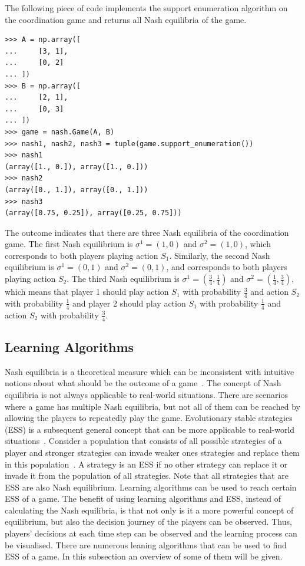 The following piece of code implements the support enumeration algorithm on the
coordination game and returns all Nash equilibria of the game.

\begin{lstlisting}[style=pystyle]
>>> A = np.array([
...     [3, 1],
...     [0, 2]
... ])
>>> B = np.array([
...     [2, 1],
...     [0, 3]
... ])
>>> game = nash.Game(A, B)
>>> nash1, nash2, nash3 = tuple(game.support_enumeration())
>>> nash1
(array([1., 0.]), array([1., 0.]))
>>> nash2
(array([0., 1.]), array([0., 1.]))
>>> nash3
(array([0.75, 0.25]), array([0.25, 0.75]))

\end{lstlisting}

The outcome indicates that there are three Nash equilibria of the coordination
game.
The first Nash equilibrium is \(\sigma^1 = (1, 0)\) and \(\sigma^2 = (1, 0)\),
which corresponds to both players playing action \(S_1\).
Similarly, the second Nash equilibrium is \(\sigma^1 = (0, 1)\) and
\(\sigma^2 = (0, 1)\), and corresponds to both players playing action \(S_2\).
The third Nash equilibrium is \(\sigma^1 = (\frac{3}{4}, \frac{1}{4})\) and
\(\sigma^2 = (\frac{1}{4}, \frac{3}{4})\), which means that player 1 should
play action \(S_1\) with probability \(\frac{3}{4}\) and action \(S_2\) with
probability \(\frac{1}{4}\) and player 2 should play action \(S_1\) with
probability \(\frac{1}{4}\) and action \(S_2\) with probability
\(\frac{3}{4}\).


\subsection{Learning Algorithms}\label{sec:game_intro_learning_algorithms}

Nash equilibria is a theoretical measure which can be inconsistent with
intuitive notions about what should be the outcome of a
game~\cite{myerson1978refinements}.
The concept of Nash equilibria is not always applicable to real-world
situations.
There are scenarios where a game has multiple Nash equilibria, but not all
of them can be reached by allowing the players to repeatedly play the game.
Evolutionary stable strategies (ESS) is a subsequent general concept that can
be more applicable to real-world situations~\cite{nowak1993evolutionary}.
Consider a population that consists of all possible strategies of a player and
stronger strategies can invade weaker ones strategies and replace them in this
population~\cite{smith1972game, smith1973logic}.
A strategy is an ESS if no other strategy can replace it or invade it from the
population of all strategies.
Note that all strategies that are ESS are also Nash equilibrium.
Learning algorithms can be used to reach certain ESS of a game.
The benefit of using learning algorithms and ESS, instead of calculating
the Nash equilibria, is that not only is it a more powerful concept of
equilibrium, but also the decision journey of the players can be observed.
Thus, players' decisions at each time step can be observed and the learning
process can be visualised.
There are numerous leaning algorithms that can be used to find ESS of a game.
In this subsection an overview of some of them will be given.

